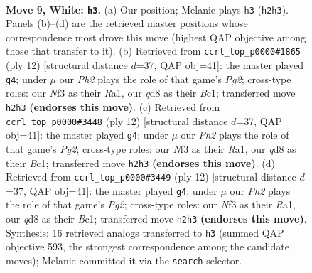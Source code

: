 \documentclass[11pt]{article}
\begin{document}
\clearpage

\begin{figure}[p]\centering
\begin{subfigure}{0.46\textwidth}\centering
\resizebox{\linewidth}{!}{%
\newchessgame
\chessboard[
  setfen={rnbqk2r/1p2bpp1/4pn2/p1Pp3p/3P4/2N2N2/PP3PPP/R1BQKBR1 w Qkq - 0 9},
  showmover=false,
  pgfstyle=straightmove, color=movearrow, markmove={h2-h3}
]}
\caption{}
\end{subfigure}\hfill
\begin{subfigure}{0.46\textwidth}\centering
\resizebox{\linewidth}{!}{%
\newchessgame
\chessboard[
  setfen={rnbqkb1r/1p3ppp/p2ppn2/8/3NP3/2N4P/PPP2PP1/R1BQKB1R w KQkq - 0 7},
  showmover=false,
  pgfstyle=straightmove, color=movearrow, markmove={g2-g4}
]}
\caption{}
\end{subfigure}
\\[4pt]
\begin{subfigure}{0.46\textwidth}\centering
\resizebox{\linewidth}{!}{%
\newchessgame
\chessboard[
  setfen={rnbqkb1r/1p3ppp/p2ppn2/8/3NP3/2N4P/PPP2PP1/R1BQKB1R w KQkq - 0 7},
  showmover=false,
  pgfstyle=straightmove, color=movearrow, markmove={g2-g4}
]}
\caption{}
\end{subfigure}\hfill
\begin{subfigure}{0.46\textwidth}\centering
\resizebox{\linewidth}{!}{%
\newchessgame
\chessboard[
  setfen={rnbqkb1r/1p3ppp/p2ppn2/8/3NP3/2N4P/PPP2PP1/R1BQKB1R w KQkq - 0 7},
  showmover=false,
  pgfstyle=straightmove, color=movearrow, markmove={g2-g4}
]}
\caption{}
\end{subfigure}
\caption{\textbf{Move 9, White: \texttt{h3}.} (a) Our position; Melanie plays \texttt{h3} (\texttt{h2h3}). Panels (b)--(d) are the retrieved master positions whose correspondence most drove this move (highest QAP objective among those that transfer to it). (b) Retrieved from \texttt{ccrl\_top\_p0000\#1865} (ply 12) [structural distance $d$=37, QAP obj=41]: the master played \texttt{g4}; under $\mu$ our \emph{Ph2} plays the role of that game's \emph{Pg2}; cross-type roles: our \emph{N}f3 as their \emph{R}a1, our \emph{q}d8 as their \emph{B}c1; transferred move \texttt{h2h3} \textbf{(endorses this move)}. (c) Retrieved from \texttt{ccrl\_top\_p0000\#3448} (ply 12) [structural distance $d$=37, QAP obj=41]: the master played \texttt{g4}; under $\mu$ our \emph{Ph2} plays the role of that game's \emph{Pg2}; cross-type roles: our \emph{N}f3 as their \emph{R}a1, our \emph{q}d8 as their \emph{B}c1; transferred move \texttt{h2h3} \textbf{(endorses this move)}. (d) Retrieved from \texttt{ccrl\_top\_p0000\#3449} (ply 12) [structural distance $d$=37, QAP obj=41]: the master played \texttt{g4}; under $\mu$ our \emph{Ph2} plays the role of that game's \emph{Pg2}; cross-type roles: our \emph{N}f3 as their \emph{R}a1, our \emph{q}d8 as their \emph{B}c1; transferred move \texttt{h2h3} \textbf{(endorses this move)}. Synthesis: 16 retrieved analogs transferred to \texttt{h3} (summed QAP objective 593, the strongest correspondence among the candidate moves); Melanie committed it via the \texttt{search} selector.}
\label{fig:thought-m16}
\end{figure}
\end{document}
